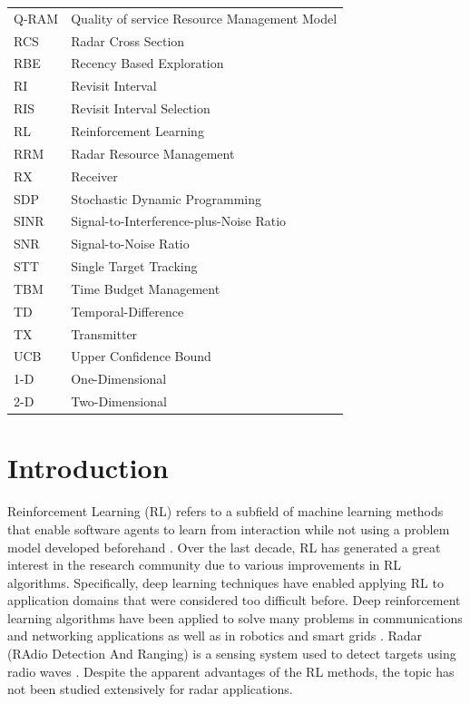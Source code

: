 \documentclass[english, 12pt, a4paper, elec, utf8, a-1b, online]{aaltothesis}
\numberwithin{equation}{section}
\begin{document}
\begin{tabular}{ll}
Q-RAM & Quality of service Resource Management Model \\
RCS & Radar Cross Section \\
RBE  & Recency Based Exploration \\
RI  & Revisit Interval \\
RIS & Revisit Interval Selection \\
RL & Reinforcement Learning \\
RRM & Radar Resource Management \\
RX & Receiver \\
SDP  & Stochastic Dynamic Programming \\
SINR  & Signal-to-Interference-plus-Noise Ratio \\
SNR & Signal-to-Noise Ratio \\
STT & Single Target Tracking \\
TBM & Time Budget Management \\
TD & Temporal-Difference \\
TX & Transmitter \\
UCB & Upper Confidence Bound \\
1-D & One-Dimensional \\
2-D & Two-Dimensional \\
\end{tabular}




\cleardoublepage
{}
\section{Introduction}
\setcounter{page}{1}

Reinforcement Learning (RL) refers to a subfield of machine learning methods that enable software agents to learn from interaction while not using a problem model developed beforehand \cite{Sutton2018}. 
Over the last decade, RL has generated a great interest in the research community due to various improvements in RL algorithms.
Specifically, deep learning techniques have enabled applying RL to application domains that were considered too difficult before. 
Deep reinforcement learning algorithms have been applied to solve many problems in communications and networking applications \cite{Luong2018} as well as in robotics \cite{Kober2013} and smart grids \cite{Zhang2018}.
Radar (RAdio Detection And Ranging) is a sensing system used to detect targets using radio waves \cite{Curry2011}.
Despite the apparent advantages of the RL methods, the topic has not been studied extensively for radar applications.
\end{document}

